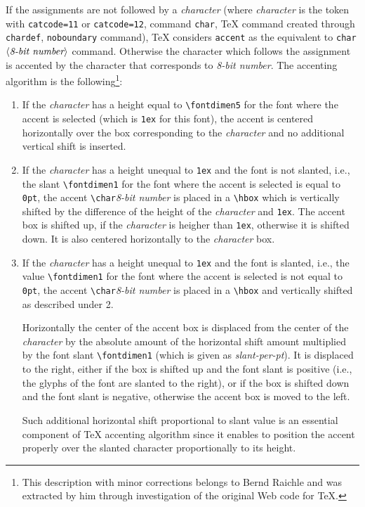 If the assignments are not followed by a {\em character}
(where {\em character} is the token with {\tt\bs{}catcode=11}
or {\tt\bs{}catcode=12}, command {\tt\bs{}char}, \TeX{} command
created through {\tt\bs{}chardef}, {\tt\bs{}noboundary}
command), \TeX{} considers {\tt\bs{}accent} as the equivalent
to {\tt\bs{}char$\left<\hbox{\em 8-bit number}\right>$} command.
Otherwise the character which follows the
assignment is accented by the character that corresponds to
{\em 8-bit number}. The accenting algorithm is the
following\footnote{This description with minor corrections
belongs to Bernd Raichle and
was extracted by him through investigation of the original Web
code for \TeX.}:
\begin{enumerate}
\item If the {\em character} has a height equal to
      \verb?\fontdimen5? for the font where the accent is selected
      (which is {\tt 1ex} for this font), the accent is
      centered horizontally over the box corresponding
      to the {\em character} and no additional vertical
      shift is inserted.
\item
      If the {\em character} has a height unequal to {\tt 1ex} and the
      font is not slanted, i.e., the slant \verb?\fontdimen1?
      for the font where the accent is selected
      is equal to {\tt 0pt}, the accent \verb?\char?{\em 8-bit number}
      is placed in a \verb?\hbox? which is vertically shifted by the
      difference of the height of the {\em character} and {\tt 1ex}.
      The accent box is shifted up, if the {\em character} is
      heigher than {\tt 1ex}, otherwise it is shifted down.
      It is also centered horizontally to the {\em character} box.
\item
      If the {\em character}  has a height unequal to {\tt 1ex} and the
      font is slanted, i.e., the value \verb?\fontdimen1?
      for the font where the accent is selected is not equal to {\tt 0pt},
      the accent \verb?\char?{\em 8-bit number} is placed in a
      \verb?\hbox? and vertically shifted as described
      under 2.

      Horizontally the center of the accent box is
      displaced from the center of the {\em character} by the
      absolute amount of the horizontal shift amount multiplied
      by the font slant \verb?\fontdimen1?
      (which is given as {\em slant-per-pt}).
      It is displaced to the right, either if the box is shifted up and
      the font slant is positive (i.e., the glyphs of the font
      are slanted to the right), or if the box is shifted down
      and the font slant is negative, otherwise the accent box is
      moved to the left.

      Such additional horizontal shift
      proportional to slant value is an essential component of
      \TeX{} accenting algorithm since it enables to position the
      accent properly over the slanted character
      proportionally to its height.

\end{enumerate}

